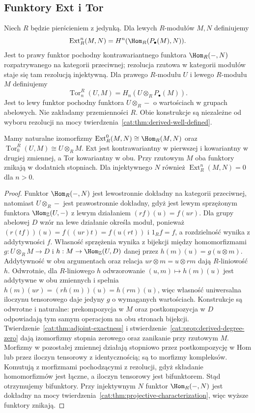 \subsection{Funktory Ext i Tor}
\begin{definicja}\label{cat:def:ext-tor}
Niech $R$ będzie pierścieniem z jedynką. Dla lewych $R$-modułów $M,N$ definiujemy
\[
 \operatorname{Ext}_R^n(M,N)=H^n(\Hom_R(P_\bullet(M),N)).
\]
Jest to prawy funktor pochodny kontrawariantnego funktora $\Hom_R(-,N)$ rozpatrywanego na kategorii przeciwnej; rezolucja rzutowa w kategorii modułów staje się tam rezolucją injektywną. Dla prawego $R$-modułu $U$ i lewego $R$-modułu $M$ definiujemy
\[
 \operatorname{Tor}_n^R(U,M)=H_n(U\otimes_R P_\bullet(M)).
\]
Jest to lewy funktor pochodny funktora $U\otimes_R-$ o wartościach w grupach abelowych. Nie zakładamy przemienności $R$. Obie konstrukcje są niezależne od wyboru rezolucji na mocy twierdzenia~\ref{cat:thm:derived-well-defined}.
\end{definicja}
\begin{stwierdzenie}\label{cat:prop:ext-tor-basic}
Mamy naturalne izomorfizmy $\operatorname{Ext}_R^0(M,N)\cong\Hom_R(M,N)$ oraz $\operatorname{Tor}_0^R(U,M)\cong U\otimes_R M$. Ext jest kontrawariantny w pierwszej i kowariantny w drugiej zmiennej, a Tor kowariantny w obu. Przy rzutowym $M$ oba funktory znikają w dodatnich stopniach. Dla injektywnego $N$ również $\operatorname{Ext}_R^n(M,N)=0$ dla $n>0$.
\end{stwierdzenie}
\begin{proof}
Funktor $\Hom_R(-,N)$ jest lewostronnie dokładny na kategorii przeciwnej, natomiast $U\otimes_R-$ jest prawostronnie dokładny, gdyż jest lewym sprzężonym funktora $\Hom_{\mathbb Z}(U,-)$ z lewym działaniem $(rf)(u)=f(ur)$. Dla grupy abelowej $D$ wzór na lewe działanie określa moduł, ponieważ $(r(tf))(u)=f((ur)t)=f(u(rt))$ i $1_Rf=f$, a rozdzielność wynika z addytywności $f$. Własność sprzężenia wynika z bijekcji między homomorfizmami $g:U\otimes_R M\to D$ i $h:M\to\Hom_{\mathbb Z}(U,D)$ danej przez $h(m)(u)=g(u\otimes m)$. Addytywność w obu argumentach oraz relacja $ur\otimes m=u\otimes rm$ dają $R$-liniowość $h$. Odwrotnie, dla $R$-liniowego $h$ odwzorowanie $(u,m)\mapsto h(m)(u)$ jest addytywne w obu zmiennych i spełnia $h(m)(ur)=(rh(m))(u)=h(rm)(u)$, więc własność uniwersalna iloczynu tensorowego daje jedyny $g$ o wymaganych wartościach. Konstrukcje są odwrotne i naturalne: prekompozycja w $M$ oraz postkompozycja w $D$ odpowiadają tym samym operacjom na obu stronach bijekcji. Twierdzenie~\ref{cat:thm:adjoint-exactness} i stwierdzenie~\ref{cat:prop:derived-degree-zero} dają izomorfizmy stopnia zerowego oraz zanikanie przy rzutowym $M$. Morfizmy w pozostałej zmiennej działają stopniowo przez postkompozycję w Hom lub przez iloczyn tensorowy z identycznością; są to morfizmy kompleksów. Komutują z morfizmami pochodzącymi z rezolucji, gdyż składanie homomorfizmów jest łączne, a iloczyn tensorowy jest bifunktorem. Stąd otrzymujemy bifunktory. Przy injektywnym $N$ funktor $\Hom_R(-,N)$ jest dokładny na mocy twierdzenia~\ref{cat:thm:projective-characterization}, więc wyższe funktory znikają.
\end{proof}
